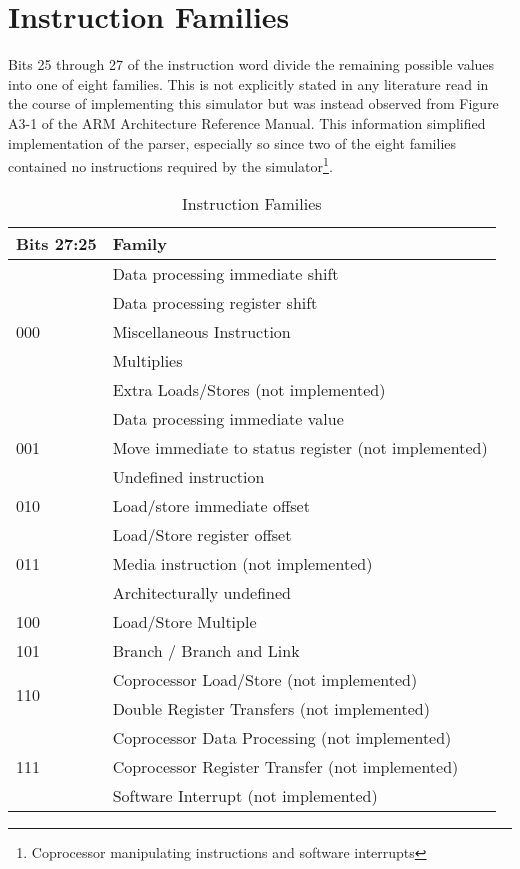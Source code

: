 \section{Instruction Families}
\label{sec:appendix:instruction_families}

Bits 25 through 27 of the instruction word divide the remaining possible values into one of eight families. This is not explicitly stated in any literature read in the course of implementing this simulator but was instead observed from Figure A3-1 of the ARM Architecture Reference Manual\citep[pp. A3-2]{armarm:2005}. This information simplified implementation of the parser, especially so since two of the eight families contained no instructions required by the simulator\footnote{Coprocessor manipulating instructions and software interrupts}.

\begin{table}
  \caption{Instruction Families}
  \label{table:families}
  \begin{tabularx}{\textwidth}{l|X}
    Bits 27:25 & Family \\ \hline
    \multirow{5}{*}{000} & Data processing immediate shift \\
                         & Data processing register shift \\
                         & Miscellaneous Instruction \\
                         & Multiplies \\
                         & Extra Loads/Stores (not implemented) \\ \hline
    \multirow{3}{*}{001} & Data processing immediate value \\
                         & Move immediate to status register (not implemented) \\
                         & Undefined instruction \\ \hline
    010 & Load/store immediate offset \\ \hline
    \multirow{3}{*}{011} & Load/Store register offset \\
                         & Media instruction (not implemented) \\
                         & Architecturally undefined \\ \hline
    100 & Load/Store Multiple \\ \hline
    101 & Branch / Branch and Link \\ \hline
    \multirow{2}{*}{110} & Coprocessor Load/Store (not implemented) \\
                         & Double Register Transfers (not implemented) \\ \hline
    \multirow{3}{*}{111} & Coprocessor Data Processing (not implemented) \\
                         & Coprocessor Register Transfer (not implemented) \\
                         & Software Interrupt (not implemented)
  \end{tabularx}
\end{table}



